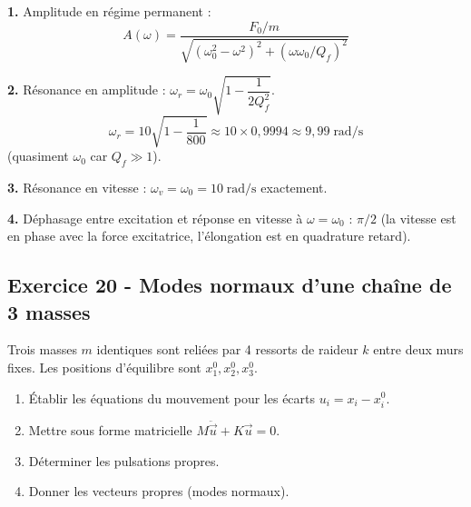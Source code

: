 \documentclass[12pt,a4paper]{article}
\begin{document}
\begin{boitecorrige}
\textbf{1.} Amplitude en régime permanent :
\[
A(\omega) = \frac{F_0/m}{\sqrt{(\omega_0^2-\omega^2)^2 + (\omega\omega_0/Q_f)^2}}
\]

\textbf{2.} Résonance en amplitude : $\omega_r = \omega_0\sqrt{1 - \dfrac{1}{2Q_f^2}}$.
\[
\omega_r = 10\sqrt{1 - \frac{1}{800}} \approx 10\times 0{,}9994 \approx 9{,}99\;\text{rad/s}
\]
(quasiment $\omega_0$ car $Q_f \gg 1$).

\textbf{3.} Résonance en vitesse : $\omega_v = \omega_0 = 10\;\text{rad/s}$ exactement.

\textbf{4.} Déphasage entre excitation et réponse en vitesse à $\omega = \omega_0$ : $\pi/2$ (la vitesse est en phase avec la force excitatrice, l'élongation est en quadrature retard).
\end{boitecorrige}

\subsection*{Exercice 20 - Modes normaux d'une chaîne de 3 masses \niveau{\difficile}}

\begin{boiteexercice}
Trois masses $m$ identiques sont reliées par 4 ressorts de raideur $k$ entre deux murs fixes. Les positions d'équilibre sont $x_1^0, x_2^0, x_3^0$.
\begin{enumerate}
  \item Établir les équations du mouvement pour les écarts $u_i = x_i - x_i^0$.
  \item Mettre sous forme matricielle $M\ddot{\vec{u}} + K\vec{u} = 0$.
  \item Déterminer les pulsations propres.
  \item Donner les vecteurs propres (modes normaux).
\end{enumerate}
\end{boiteexercice}
\end{document}

